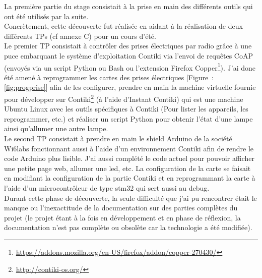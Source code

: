 \documentclass{article}
\begin{document}
La première partie du stage consistait à la prise en main des différents outils qui ont été utilisés par la suite.\\
Concrètement, cette découverte fut réalisée en aidant à la réalisation de deux différents TPs (cf annexe C) pour un cours d'été.\\
Le premier TP consistait à contrôler des prises électriques par radio grâce à une puce embarquant le système d'exploitation Contiki via l'envoi de requêtes CoAP (envoyés via un script Python ou Bash ou l'extension Firefox Copper\footnote{\url{https://addons.mozilla.org/en-US/firefox/addon/copper-270430/}}). J'ai donc été amené à reprogrammer les cartes des prises électriques [Figure~: \ref{fig:progprise}] afin de les configurer, prendre en main la machine virtuelle fournie pour développer sur Contiki\footnote{\url{http://contiki-os.org/}} (à l'aide d'Instant Contiki) qui est une machine Ubuntu Linux avec les outils spécifiques à Contiki (Pour lister les appareils, les reprogrammer, etc.) et réaliser un script Python pour obtenir l'état d'une lampe ainsi qu'allumer une autre lampe.\\
Le second TP consistait à prendre en main le shield Arduino de la société Wi6labs fonctionnant aussi à l'aide d'un environnement Contiki afin de rendre le code Arduino plus lisible. J'ai aussi complété le code actuel pour pouvoir afficher une petite page web, allumer une led, etc. La configuration de la carte se faisait en modifiant la configuration de la partie Contiki et en reprogrammant la carte à l'aide d'un microcontrôleur de type stm32 qui sert aussi au debug.\\
Durant cette phase de découverte, la seule difficulté que j'ai pu rencontrer était le manque ou l'inexactitude de la documentation sur des parties complètes du projet (le projet étant à la fois en développement et en phase de réflexion, la documentation n'est pas complète ou obsolète car la technologie a été modifiée).\\
\end{document}
